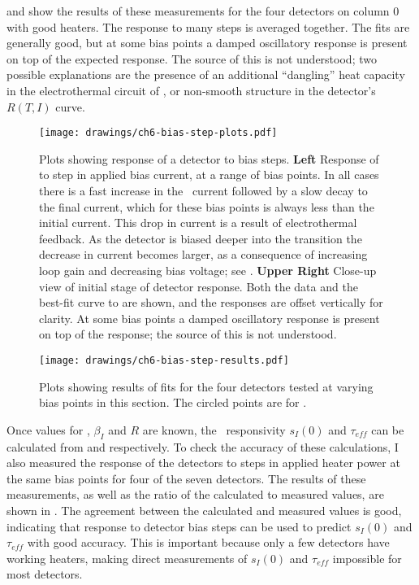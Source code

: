  and  show the results of these measurements for the four detectors on column 0 with good heaters.
The response to many steps is averaged together.
The fits are generally good, but at some bias points a damped oscillatory response is present on top of the expected  response.
The source of this is not understood; two possible explanations are the presence of an additional ``dangling'' heat capacity in the electrothermal circuit of  \cite{hoevers_thermal_2000,zink_array-compatible_2006,maasilta_complex_2012}, or non-smooth structure in the detector's $R(T,I)$ curve.

\begin{figure*}
  \centering
\texttt{[image: drawings/ch6-bias-step-plots.pdf]}
\caption[Plots showing response of a detector to bias steps]{
  Plots showing response of a detector to bias steps.
\textbf{Left}
Response of  to step in applied bias current, at a range of bias points.
In all cases there is a fast increase in the \TES\ current followed by a slow decay to the final current, which for these bias points is always less than the initial current.
This drop in current is a result of electrothermal feedback.
As the detector is biased deeper into the transition the decrease in current becomes larger, as a consequence of increasing loop gain and decreasing bias voltage; see .
\textbf{Upper Right}
Close-up view of initial stage of detector response.
Both the data and the best-fit curve to  are shown, and the responses are offset vertically for clarity.
At some bias points a damped oscillatory response is present on top of the  response; the source of this is not understood.
}
\label{fig:ch6-bias-step-plots}
\end{figure*}

\begin{figure*}
  \centering
\texttt{[image: drawings/ch6-bias-step-results.pdf]}
\caption[Results of bias step fits]{
  Plots showing results of fits for the four detectors tested at varying bias points in this section.
  The circled points are for \SOC.
}
\label{fig:ch6-bias-step-results}
\end{figure*}

Once values for \Loop, $\beta_I$ and $R$ are known, the \DC\ responsivity $s_I(0)$ and $\tau_{eff}$ can be calculated from  and  respectively.
To check the accuracy of these calculations, I also measured the response of the detectors to steps in applied heater power at the same bias points for four of the seven detectors.
The results of these measurements, as well as the ratio of the calculated to measured values, are shown in .
The agreement between the calculated and measured values is good, indicating that response to detector bias steps can be used to predict $s_I(0)$ and $\tau_{eff}$ with good accuracy.
This is important because only a few detectors have working heaters, making direct measurements of $s_I(0)$ and $\tau_{eff}$ impossible for most detectors.

